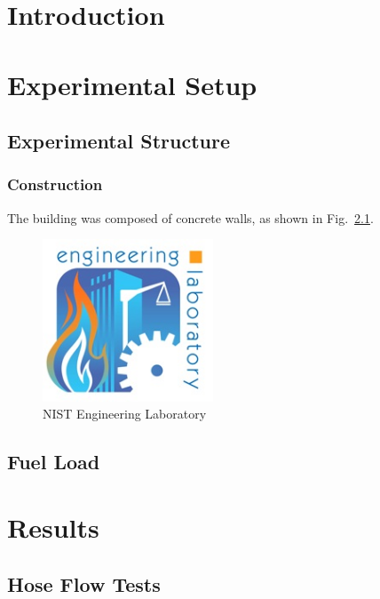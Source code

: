 \documentclass[11pt,oneside]{book}
\begin{document}
\mainmatter

\chapter{Introduction}
\label{chap:Introduction}

\chapter{Experimental Setup}
\label{chap:Experimental_Setup}

\section{Experimental Structure}
\label{sec:Experimental_Structure}

\subsection{Construction}
\label{sec:Construction}
The building was composed of concrete walls, as shown in Fig.~\ref{fig:EL_Logo_Example}.

\begin{figure}[!ht]
\includegraphics[width=2in]{../Figures/el_logo_small}
\caption{NIST Engineering Laboratory}
\label{fig:EL_Logo_Example}
\end{figure}

\section{Fuel Load}

\chapter{Results}
\label{chap:Results}

\section{Hose Flow Tests}
\end{document}
